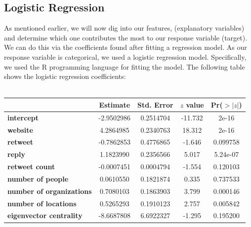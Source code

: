 \documentclass[12pt]{article}
\begin{document}
\subsection{Logistic Regression}
As mentioned earlier, we will now dig into our features, (explanatory variables) and determine which one contributes the most to our response variable (target). We can do this via the coefficients found after fitting a regression model. As our response variable is categorical, we used a logistic regression model. Specifically, we used the R programming language for fitting the model. The following table shows the logistic regression coefficients:\\
\\
\begin{centering}
\begin{tabular}[b]{l||c|c|c|c|}
         \textbf{} &\textbf{Estimate} &\textbf{Std. Error} &\textbf{$z$ value} &\textbf{Pr($>|z|$)} \\
         \hline    
         \hline
         \textbf{intercept} &-2.9502986 &0.2514704 &-11.732 & 2e-16 \\
         \hline
         \textbf{website} &4.2864985 &0.2340763 &18.312 & 2e-16 \\
         \hline
         \textbf{retweet} &-0.7862853 &0.4776865 &-1.646 &0.099758 \\
         \hline
         \textbf{reply} &1.1823990 &0.2356566 &5.017 &5.24e-07 \\
         \hline
         \textbf{retweet count} &-0.0007451 &0.0004794 &-1.554 &0.120103 \\
         \hline
         \textbf{number of people} &0.0610550 &0.1821874 &0.335 &0.737533 \\
         \hline
         \textbf{number of organizations} &0.7080103 &0.1863903 &3.799 &0.000146 \\
         \hline
         \textbf{number of locations} &0.5265293 &0.1910123 &2.757 &0.005842 \\
         \hline
         \textbf{eigenvector centrality} &-8.6687808 &6.6922327 &-1.295 &0.195200 \\
       \end{tabular}
       \end{centering}\\
\end{document}
